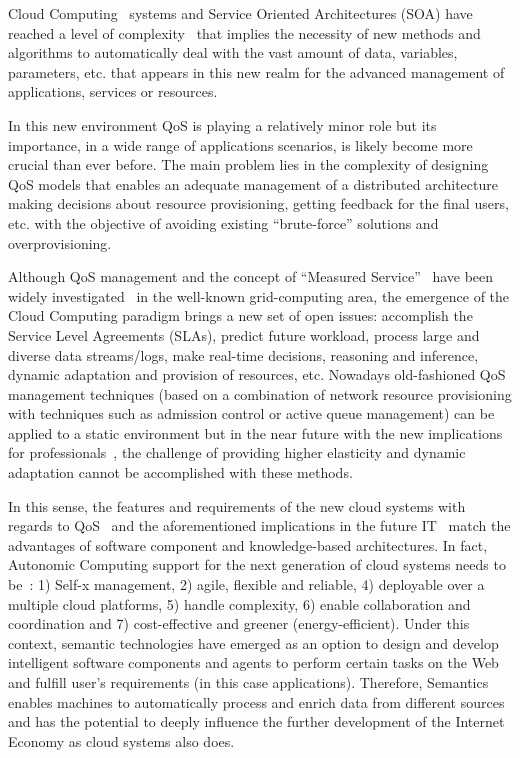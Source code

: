 Cloud Computing~\cite{mell2011nist} systems and Service Oriented Architectures (SOA) have 
reached a level of complexity~\cite{Huebscher:2008:SAC:1380584.1380585,Conejero:2012:MSQ:2357487.2357591} 
that implies the necessity of new methods and algorithms to automatically deal 
with the vast amount of data, variables, parameters, etc. that appears 
in this new realm for the advanced management of applications, services or resources. 

In this new environment QoS is playing a relatively minor role but its 
importance, in a wide range of applications scenarios, is likely become more 
crucial than ever before. The main problem lies in the complexity 
of designing QoS models that enables an adequate management of a distributed 
architecture making decisions about resource provisioning, getting feedback for 
the final users, etc. with the objective of avoiding existing ``brute-force''
solutions and overprovisioning. 

Although QoS management and the concept of ``Measured Service''~\cite{mell2011nist} have 
been widely investigated~\cite{Conejero:2012:MSQ:2357487.2357591} in the well-known grid-computing area, 
the emergence of the Cloud Computing paradigm brings a new set of open issues: accomplish the 
Service Level Agreements (SLAs), predict future workload, process large and diverse data streams/logs, 
make real-time decisions, reasoning and inference, dynamic adaptation and provision of 
resources, etc. Nowadays old-fashioned QoS management techniques (based on a combination of network resource 
provisioning with techniques such as admission control or active queue management) can be applied to a static 
environment but in the near future with the new implications for professionals~\cite{DBLP:journals/jucs/Colomo-PalaciosFSS12}, the challenge of 
providing higher elasticity and dynamic adaptation cannot be accomplished with these methods. 

In this sense, the features and requirements of the new cloud systems with regards 
to QoS~\cite{Pedersen:2011:AMQ:2114495.2115542} and the aforementioned implications in the 
future IT~\cite{DBLP:journals/jucs/Colomo-PalaciosFSS12} match the advantages 
of software component and knowledge-based architectures. In fact, Autonomic Computing support 
for the next generation of cloud systems needs to be~\cite{Conejero:2012:MSQ:2357487.2357591,Pedersen:2011:AMQ:2114495.2115542}: 
1) Self-x management, 2) agile, flexible and reliable, 4) deployable over a multiple cloud platforms, 5) handle complexity, 6) enable 
collaboration and coordination and 7) cost-effective and greener 
(energy-efficient). Under this context, semantic technologies have emerged as an 
option to design and develop intelligent software components and agents to 
perform certain tasks on the Web and fulfill user's requirements (in this case 
applications). Therefore, Semantics enables machines to automatically process 
and enrich data from different sources and has the potential to deeply influence 
the further development of the Internet Economy as cloud systems also does.

